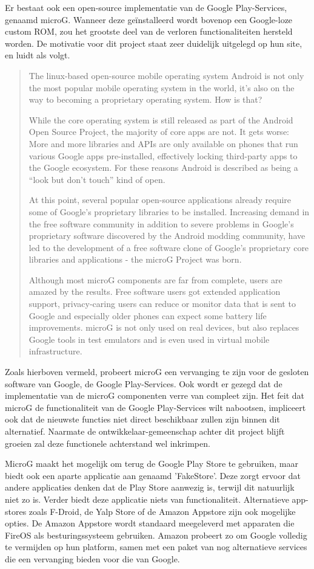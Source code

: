 Er bestaat ook een open-source implementatie van de Google Play-Services, genaamd microG. Wanneer deze geïnstalleerd wordt bovenop een Google-loze custom ROM, zou het grootste deel van de verloren functionaliteiten hersteld worden. De motivatie voor dit project staat zeer duidelijk uitgelegd op hun site, en luidt als volgt. \blockcquote{microg}{
    The linux-based open-source mobile operating system Android is not only the most popular mobile operating system in the world, it’s also on the way to becoming a proprietary operating system. How is that?
    
    While the core operating system is still released as part of the Android Open Source Project, the majority of core apps are not. It gets worse: More and more libraries and APIs are only available on phones that run various Google apps pre-installed, effectively locking third-party apps to the Google ecosystem. For these reasons Android is described as being a “look but don’t touch” kind of open.
    
    At this point, several popular open-source applications already require some of Google’s proprietary libraries to be installed. Increasing demand in the free software community in addition to severe problems in Google’s proprietary software discovered by the Android modding community, have led to the development of a free software clone of Google’s proprietary core libraries and applications - the microG Project was born.
    
    Although most microG components are far from complete, users are amazed by the results. Free software users got extended application support, privacy-caring users can reduce or monitor data that is sent to Google and especially older phones can expect some battery life improvements. microG is not only used on real devices, but also replaces Google tools in test emulators and is even used in virtual mobile infrastructure.
}
Zoals hierboven vermeld, probeert microG een vervanging te zijn voor de gesloten software van Google, de Google Play-Services. Ook wordt er gezegd dat de implementatie van de microG componenten verre van compleet zijn. Het feit dat microG de functionaliteit van de Google Play-Services wilt nabootsen, impliceert ook dat de nieuwste functies niet direct beschikbaar zullen zijn binnen dit alternatief. Naarmate de ontwikkelaar-gemeenschap achter dit project blijft groeien zal deze functionele achterstand wel inkrimpen.

MicroG maakt het mogelijk om terug de Google Play Store te gebruiken, maar biedt ook een aparte applicatie aan genaamd 'FakeStore'. Deze zorgt ervoor dat andere applicaties denken dat de Play Store aanwezig is, terwijl dit natuurlijk niet zo is. Verder biedt deze applicatie niets van functionaliteit. Alternatieve app-stores zoals F-Droid, de Yalp Store of de Amazon Appstore zijn ook mogelijke opties. \autocite{shadow53_play-store} De Amazon Appstore wordt standaard meegeleverd met apparaten die FireOS als besturingssysteem gebruiken. Amazon probeert zo om Google volledig te vermijden op hun platform, samen met een paket van nog alternatieve services die een vervanging bieden voor die van Google.

